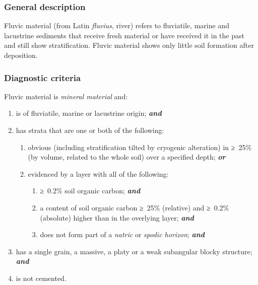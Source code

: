 \documentclass[
  letterpaper,
  DIV=11,
  numbers=noendperiod]{scrreprt}
\providecommand{\tightlist}{%
  \setlength{\itemsep}{0pt}\setlength{\parskip}{0pt}}\usepackage{longtable,booktabs,array}
\begin{document}
\hypertarget{general-description-59}{%
\subsubsection{General description}\label{general-description-59}}

Fluvic material (from Latin \emph{fluvius}, river) refers to fluviatile,
marine and lacustrine sediments that receive fresh material or have
received it in the past and still show stratification. Fluvic material
shows only little soil formation after deposition.

\hypertarget{diagnostic-criteria-62}{%
\subsubsection{Diagnostic criteria}\label{diagnostic-criteria-62}}

Fluvic material is \emph{mineral material} and:

\begin{enumerate}
\def\labelenumi{\arabic{enumi}.}
\tightlist
\item
  is of fluviatile, marine or lacustrine origin; \textbf{\emph{and}}
\item
  has strata that are one or both of the following:

  \begin{enumerate}
  \def\labelenumii{\alph{enumii}.}
  \tightlist
  \item
    obvious (including stratification tilted by cryogenic alteration) in
    ≥~25\% (by volume, related to the whole soil) over a specified
    depth; \textbf{\emph{or}}
  \item
    evidenced by a layer with all of the following:

    \begin{enumerate}
    \def\labelenumiii{\roman{enumiii}.}
    \tightlist
    \item
      ≥~0.2\% soil organic carbon; \textbf{\emph{and}}
    \item
      a content of soil organic carbon ≥~25\% (relative) and ≥~0.2\%
      (absolute) higher than in the overlying layer; \textbf{\emph{and}}
    \item
      does not form part of a \emph{natric} or \emph{spodic horizon};
      \textbf{\emph{and}}
    \end{enumerate}
  \end{enumerate}
\item
  has a single grain, a massive, a platy or a weak subangular blocky
  structure; \textbf{\emph{and}}
\item
  is not cemented.
\end{enumerate}
\end{document}

